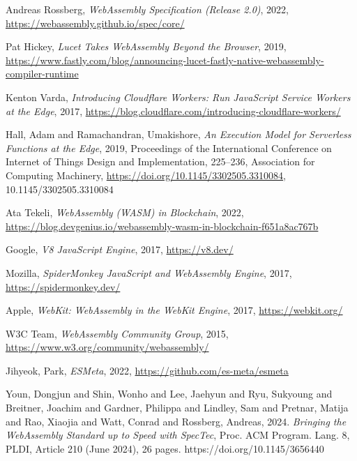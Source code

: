 \begin{thebibliography}{00}

 Andreas Rossberg, \textit{WebAssembly Specification (Release 2.0)}, 2022, \url{https://webassembly.github.io/spec/core/}

 Pat Hickey, \textit{Lucet Takes WebAssembly Beyond the Browser}, 2019, \url{https://www.fastly.com/blog/announcing-lucet-fastly-native-webassembly-compiler-runtime}

 Kenton Varda, \textit{Introducing Cloudflare Workers: Run JavaScript Service Workers at the Edge}, 2017, \url{https://blog.cloudflare.com/introducing-cloudflare-workers/}

 Hall, Adam and Ramachandran, Umakishore, \textit{An Execution Model for Serverless Functions at the Edge}, 2019,
 Proceedings of the International Conference on Internet of Things Design and Implementation, 225–236, Association for Computing Machinery, \url{https://doi.org/10.1145/3302505.3310084}, 10.1145/3302505.3310084

 Ata Tekeli, \textit{WebAssembly (WASM) in Blockchain}, 2022, \url{https://blog.devgenius.io/webassembly-wasm-in-blockchain-f651a8ac767b}

 Google, \textit{V8 JavaScript Engine}, 2017, \url{https://v8.dev/}

 Mozilla, \textit{SpiderMonkey JavaScript and WebAssembly Engine}, 2017, \url{https://spidermonkey.dev/}

 Apple, \textit{WebKit: WebAssembly in the WebKit Engine}, 2017, \url{https://webkit.org/}

 W3C Team, \textit{WebAssembly Community Group}, 2015, \url{https://www.w3.org/community/webassembly/}

 Jihyeok, Park, \textit{ESMeta}, 2022, \url{https://github.com/es-meta/esmeta}

 Youn, Dongjun and Shin, Wonho and Lee, Jaehyun  and Ryu, Sukyoung and Breitner, Joachim and Gardner, Philippa and Lindley, Sam and Pretnar, Matija and Rao, Xiaojia and Watt, Conrad and Rossberg, Andreas, 2024. \textit{Bringing the WebAssembly Standard up to Speed with SpecTec}, Proc. ACM Program. Lang. 8, PLDI, Article 210 (June 2024), 26 pages. https://doi.org/10.1145/3656440


\end{thebibliography}
